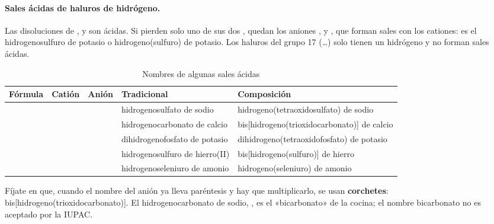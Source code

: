 \paragraph{Sales ácidas de haluros de hidrógeno.} Las disoluciones de ,  y  son ácidas. Si pierden solo
uno de sus dos , quedan los aniones ,  y , que forman sales con los cationes:  es el
hidrogenosulfuro de potasio o hidrogeno(sulfuro) de potasio. Los haluros del grupo 17 (…) solo tienen un hidrógeno y no
forman sales ácidas.

\begin{table}[H]
    \centering
    \caption{Nombres de algunas sales ácidas}
    \vspace{-5pt}
    \begin{tabular}{@{}lllL{3.6cm}L{5.4cm}@{}}
        \toprule
        \textbf{Fórmula} & \textbf{Catión} & \textbf{Anión} & \textbf{Tradicional} & \textbf{Composición} \\
        \midrule
         &  &  & hidrogenosulfato de sodio & hidrogeno(tetraoxidosulfato) de sodio \\[3pt]
         &  &  & hidrogenocarbonato de calcio & bis[hidrogeno(trioxidocarbonato)] de calcio \\[3pt]
         &  &  & dihidrogenofosfato de potasio & dihidrogeno(tetraoxidofosfato) de potasio \\[3pt]
         &  &  & hidrogenosulfuro de hierro(II) & bis[hidrogeno(sulfuro)] de hierro \\[3pt]
         &  &  & hidrogenoseleniuro de amonio & hidrogeno(seleniuro) de amonio \\
        \bottomrule
    \end{tabular}
    \label{tab:ud5-sales-acidas}
\end{table}

Fíjate en que, cuando el nombre del anión ya lleva paréntesis y hay que multiplicarlo, se usan \textbf{corchetes}:
bis[hidrogeno(trioxidocarbonato)]. El hidrogenocarbonato de sodio, , es el «bicarbonato» de la cocina; el
nombre bicarbonato no es aceptado por la IUPAC.

